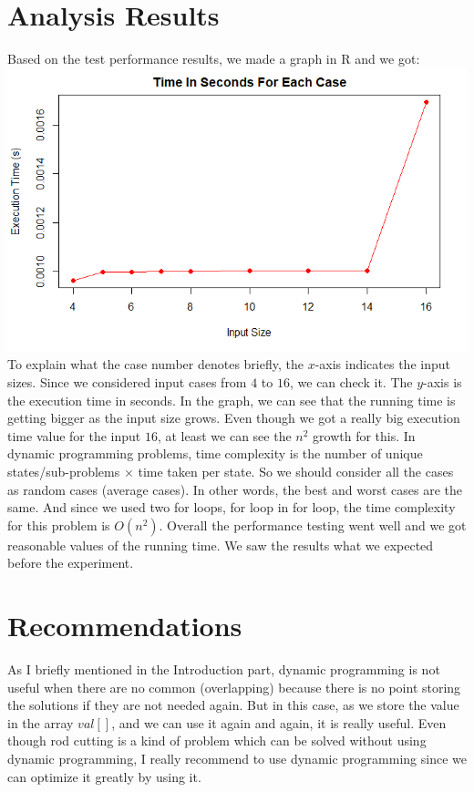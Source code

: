 \documentclass{article}
\begin{document}
\section{\textbf{Analysis Results}}
\indent Based on the test performance results, we made a graph in R and we got: \\
\includegraphics[scale = 0.65]{graph.png} \\
\indent To explain what the case number denotes briefly, the $x$-axis indicates the input sizes. Since we considered input cases from $4$ to $16$, we can check it. The $y$-axis is the execution time in seconds. In the graph, we can see that the running time is getting bigger as the input size grows. Even though we got a really big execution time value for the input $16$, at least we can see the $n^2$ growth for this. In dynamic programming problems, time complexity is the number of unique states/sub-problems $\times$ time taken per state. So we should consider all the cases as random cases (average cases). In other words, the best and worst cases are the same. And since we used two for loops, for loop in for loop, the time complexity for this problem is $O(n^2)$. Overall the performance testing went well and we got reasonable values of the running time. We saw the results what we expected before the experiment.

\section{\textbf{Recommendations}}
\indent \indent As I briefly mentioned in the Introduction part, dynamic programming is not useful when there are no common (overlapping) because there is no point storing the solutions if they are not needed again. But in this case, as we store the value in the array $val[]$, and we can use it again and again, it is really useful. Even though rod cutting is a kind of problem which can be solved without using dynamic programming, I really recommend to use dynamic programming since we can optimize it greatly by using it.  
\end{document}
